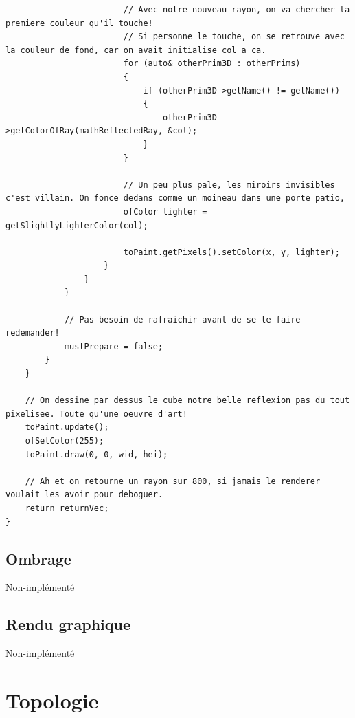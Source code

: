 \begin{lstlisting}
						// Avec notre nouveau rayon, on va chercher la premiere couleur qu'il touche!
						// Si personne le touche, on se retrouve avec la couleur de fond, car on avait initialise col a ca.
						for (auto& otherPrim3D : otherPrims)
						{
							if (otherPrim3D->getName() != getName())
							{
								otherPrim3D->getColorOfRay(mathReflectedRay, &col);
							}
						}
						
						// Un peu plus pale, les miroirs invisibles c'est villain. On fonce dedans comme un moineau dans une porte patio,
						ofColor lighter = getSlightlyLighterColor(col);
						
						toPaint.getPixels().setColor(x, y, lighter);
					}
				}
			}
			
			// Pas besoin de rafraichir avant de se le faire redemander!
			mustPrepare = false;
		}
	}
	
	// On dessine par dessus le cube notre belle reflexion pas du tout pixelisee. Toute qu'une oeuvre d'art!
	toPaint.update();
	ofSetColor(255);
	toPaint.draw(0, 0, wid, hei);
	
	// Ah et on retourne un rayon sur 800, si jamais le renderer voulait les avoir pour deboguer.
	return returnVec;
}
\end{lstlisting}

\newpage

\subsection{Ombrage}
Non-implémenté

\newpage

\subsection{Rendu graphique}
Non-implémenté

\pagebreak
\section{Topologie}
